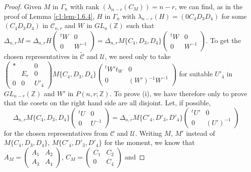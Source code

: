 \begin{proof}
Given $M$ in $\Gamma_{n}$ with rank $(\lambda_{n-r}(C_{M}))=n-r$, we
can find, as in the proof of Lemma \ref{c1:lem-1.6.4}, $H$ in
$\Gamma_{n}$ with $\lambda_{n-r}(H)=(0C_{4}D_{3}D_{4})$ for some
$(C_{4}D_{3}D_{4})$ in $\mathscr{C}_{n,r}$ and $W$ in
$GL_{n}(\mathbb{Z})$ such that
$\Delta_{n,r}M=\Delta_{n,r}H\left(\begin{smallmatrix} {}^{t}W & 0\\ 0
  &
  W^{-1}\end{smallmatrix}\right)=\Delta_{n,r}M\{C_{4},D_{3},D_{4}\}\left(\begin{smallmatrix}
  {}^{t}W & 0 \\ 0 & W^{-1}\end{smallmatrix}\right)$. To get the
chosen representatives in $\tilde{\mathscr{C}}$ and $\mathscr{U}$,
we need only to take $\left(\begin{smallmatrix} \ast & & 0\\ & E_{r} &
  0\\ 0 & 0 &
  U'_{4}\end{smallmatrix}\right)M\{C_{4},D_{3},D_{4}\}\left(\begin{smallmatrix}
  {}^{t}W't_{W} & 0\\ 0 & (W'){}^{-1}W^{-1}
\end{smallmatrix}\right)$ for  suitable $U'_{4}$ in
$GL_{n-r}(\mathbb{Z})$ and $W'$ in $P(n,r;\mathbb{Z})$. To prove (i),
we have therefore only to prove that the cosets on the right hand side
are all disjoint. Let, if possible,
$$
\Delta_{n,r}M\{C_{4},D_{3},D_{4}\}
\begin{pmatrix}
{}^{t}U & 0\\
0 & U^{-1}
\end{pmatrix}
=\Delta_{n,r}M\{C'_{4},D'_{3},D'_{4}\}
\begin{pmatrix}
{}^{t}U' & 0\\
0 & (U')^{-1}
\end{pmatrix}
$$
for the chosen representatives from $\mathscr{C}$ and
$\mathscr{U}$. Writing $M$, $M'$ instead of $M\{C_{4},D_{3},D_{4}\}$,
$M\{C'_{4},D'_{3},D'_{4}\}$ for the moment, we know that
$A_{M}=\left(\begin{smallmatrix} A_{1} & A_{2}\\ A_{3} & A_{4}
\end{smallmatrix}\right)$, $C_{M}=\left(\begin{smallmatrix} C_{1} &
  C_{2}\\ 0 & C_{4}\end{smallmatrix}\right)$ and

\end{proof}
